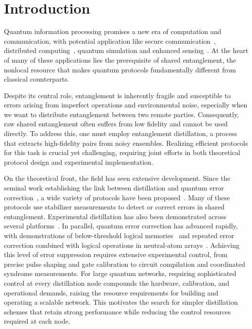 \documentclass[onecolumn,prx,longbibliography,nofootinbib, superscriptaddress]{revtex4-2}
\theoremstyle{recap}
\begin{document}
\tableofcontents

\section{Introduction}

Quantum information processing promises a new era of computation and communication, with potential application like secure communication~\cite{bennett1984bb84, bennett1993teleportation}, distributed computing~\cite{cirac1999distributed, gottesman1999demonstrating, vanmeter2016path}, quantum simulation and enhanced sensing~\cite{gottesman2012telescopes}. At the heart of many of these applications lies the prerequisite of shared entanglement, the nonlocal resource that makes quantum protocols fundamentally different from classical counterparts.

Despite its central role, entanglement is inherently fragile and susceptible to errors arising from imperfect operations and environmental noise, especially when we want to distribute entanglement between two remote parties. Consequently, raw shared entanglement often suffers from low fidelity and cannot be used directly. To address this, one must employ entanglement distillation, a process that extracts high-fidelity pairs from noisy ensembles. Realizing efficient protocols for this task is crucial yet challenging, requiring joint efforts in both theoretical protocol design and experimental implementation.

On the theoretical front, the field has seen extensive development. Since the seminal work establishing the link between distillation and quantum error correction~\cite{BDSW}, a wide variety of protocols have been proposed~\cite{gottesman2003two-way,devetak2005distillation, chau2002practical, kraus2005lower, watanabe2007key, Du2025AKD, gu2025}. Many of these protocols use stabilizer measurements to detect or correct errors in shared entanglement. Experimental distillation has also been demonstrated across several platforms~\cite{Pan2001, Kalb2017, Kru23, Liu2022, Ecker21single-distillation}. In parallel, quantum error correction has advanced rapidly, with demonstrations of below-threshold logical memories~\cite{Google25Willow} and repeated error correction combined with logical operations in neutral-atom arrays~\cite{Bluvstein2026FaultTolerant}. Achieving this level of error suppression requires extensive experimental control, from precise pulse shaping and gate calibration to circuit compilation and coordinated syndrome measurements. For large quantum networks, requiring sophisticated control at every distillation node compounds the hardware, calibration, and operational demands, raising the resource requirements for building and operating a scalable network. This motivates the search for simpler distillation schemes that retain strong performance while reducing the control resources required at each node.
\end{document}
